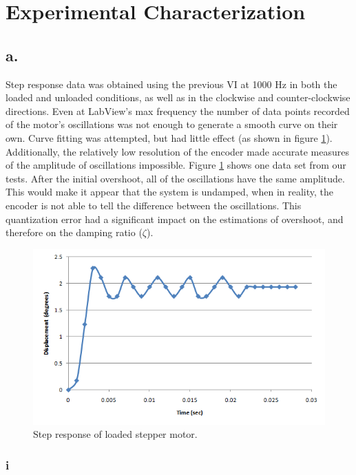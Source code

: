 \documentclass{article}
\theoremstyle{plain}
\theoremstyle{definition}
\theoremstyle{remark}
\begin{document}
\clearpage

\section{Experimental Characterization}
\subsection*{a.}
Step response data was obtained using the previous VI at 1000 Hz in both the loaded and unloaded conditions, as well as in the clockwise and counter-clockwise directions. Even at LabView's max frequency the number of data points recorded of the motor's oscillations was not enough to generate a smooth curve on their own. Curve fitting was attempted, but had little effect (as shown in figure \ref{q3a_1}). Additionally, the relatively low resolution of the encoder made accurate measures of the amplitude of oscillations impossible. Figure \ref{q3a_1} shows one data set from our tests. After the initial overshoot, all of the oscillations have the same amplitude. This would make it appear that the system is undamped, when in reality, the encoder is not able to tell the difference between the oscillations. This quantization error had a significant impact on the estimations of overshoot, and therefore on the damping ratio ($\zeta$).\\

\begin{figure}[hbt]
\begin{center}
\includegraphics[width = 14cm]{StepResponse.png}
\caption{Step response of loaded stepper motor.}
\label{q3a_1}
\end{center}
\end{figure}

\subsubsection*{i}
\end{document}
